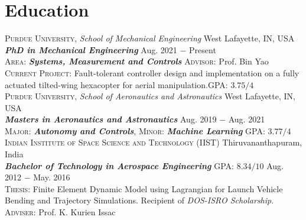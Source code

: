 \documentclass[letterpaper,10pt]{article}
\begin{document}
\renewcommand\refname{Publications}
\nocite{improvBandwidth}


\section{Education}
\noindent \textsc{Purdue University}, \textit{School of Mechanical Engineering} \hfill West Lafayette, IN, USA \\
\textbf{\textit{PhD in Mechanical Engineering}} \hfill Aug. 2021 $-$ Present\\
\textsc{Area}: \textit{\textbf{Systems, Measurement and Controls}}  \hfill \textsc{Advisor}: Prof. Bin Yao\\
\textsc{Current Project}: Fault-tolerant controller design and implementation on
a fully actuated tilted-wing hexacopter for aerial manipulation.\hfill \textsc{GPA}: $3.75/4$\\
\vspace{5pt}
\noindent \textsc{Purdue University}, \textit{School of Aeronautics and Astronautics} \hfill West Lafayette, IN, USA \\
\textbf{\textit{Masters in Aeronautics and Astronautics}} \hfill Aug. 2019 $-$ Aug. 2021\\
\textsc{Major}: \textit{\textbf{Autonomy and Controls}}, \textsc{Minor}: \textit{\textbf{Machine Learning}}
\hfill \textsc{GPA}: $3.77/4$\\

\vspace{5pt}
\noindent \textsc{Indian Institute of Space Science and Technology (IIST)} \hfill Thiruvananthapuram, India\\
\textbf{\textit{Bachelor of Technology in Aerospace Engineering}} \hfill \textsc{GPA}: $8.34/10$ \hfill Aug. 2012 $-$ May. 2016 \\
\textsc{Thesis}: Finite Element Dynamic Model using Lagrangian for Launch
Vehicle Bending and Trajectory Simulations.
Recipient of \textit{DOS-ISRO Scholarship}.
\hfill \textsc{Adviser}: Prof. K. Kurien Issac \\
\end{document}
